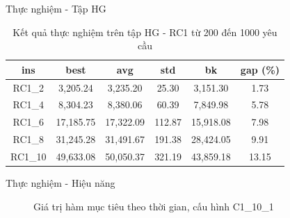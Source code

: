 \begin{frame}{Thực nghiệm - Tập HG}
  \begin{table}
    \begin{tabular}{cccccc}
      \hline
      ins & best & avg & std & bk & gap (\%) \\ \hline
      RC1\_2 & 3,205.24	& 3,235.20 & 25.30 & 3,151.30	& 1.73 \\ \hline
      RC1\_4 & 8,304.23 & 8,380.06	& 60.39	& 7,849.98 & 5.78 \\ \hline
      RC1\_6 & 17,185.75 & 17,322.09 & 112.87 & 15,918.08	& 7.98 \\ \hline
      RC1\_8 & 31,245.28 & 31,491.67 & 191.38 & 28,424.05	&	9.91 \\ \hline
      RC1\_10 & 49,633.08	& 50,050.37	& 321.19 & 43,859.18 & 13.15 \\ \hline
    \end{tabular}
    \caption{Kết quả thực nghiệm trên tập HG - RC1 từ 200 đến 1000 yêu cầu}
  \end{table}
\end{frame}

\begin{frame}{Thực nghiệm - Hiệu năng}
  \begin{figure}
    \centering
    \quad
  \caption{Giá trị hàm mục tiêu theo thời gian, cấu hình C1\_10\_1}
  \end{figure}
\end{frame}

